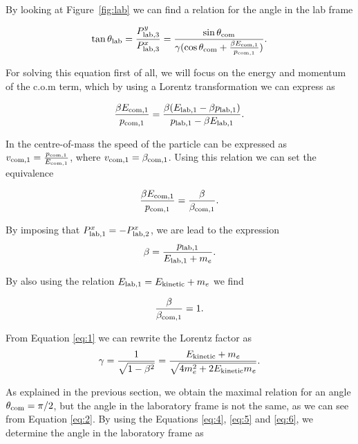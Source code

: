 \documentclass[10pt,swedish, openany]{book}
\begin{document}
By looking at Figure~\ref{fig:lab} we can find a relation for the angle in the lab frame

\begin{equation}\label{eq:2}
    \tan{\theta_{\rm lab}} = \frac{P^y_{\rm lab,3}}{P^x_{\rm lab,3}} = \frac{\sin{\theta_{\rm com}}}{\gamma(\cos{\theta_{\rm com}}+\frac{\beta E_{\rm com,1}}{p_{\rm com,1}})}.
\end{equation}

For solving this equation first of all, we will focus on the energy and momentum of the c.o.m term, which by using a Lorentz transformation we can express as

\begin{equation}\label{eq:3}
    \frac{\beta E_{\rm com,1}}{p_{\rm com,1}} = \frac{\beta (E_{\rm lab,1}-\beta p_{\rm lab,1})}{p_{\rm lab,1}-\beta E_{\rm lab,1}}.
\end{equation}

In the centre-of-mass the speed of the particle can be expressed as $v_{\rm com,1} = \frac{p_{\rm com,1}}{E_{\rm com,1}}$, where $v_{\rm com,1} = \beta_{\rm com,1}$. Using this relation we can set the equivalence

\begin{equation}\label{eq:4}
    \frac{\beta E_{\rm com,1}}{p_{\rm com,1}} = \frac{\beta}{\beta_{\rm com,1}}.
\end{equation}

By imposing that $P^x_{\rm lab,1}=-P^x_{\rm lab,2}$, we are lead to the expression
\begin{equation}\label{eq:1}
    \beta = \frac{p_{\rm lab,1}}{E_{\rm lab,1}+m_e}.
\end{equation}

By also using the relation $E_{\rm lab,1}=E_{\rm kinetic}+m_e$ we find 

\begin{equation}\label{eq:5}
    \frac{\beta}{\beta_{\rm com,1}} = 1.
\end{equation}

From Equation \ref{eq:1} we can rewrite the Lorentz factor as
\begin{equation}\label{eq:6}
    \gamma = \frac{1}{\sqrt{1-\beta^2}}= \frac{E_{\rm kinetic}+m_e}{\sqrt{4m_e^2 + 2 E_{\rm kinetic}m_e}}.
\end{equation}

As explained in the previous section, we obtain the maximal relation for an angle $\theta_{\rm com} = \pi/2$, but the angle in the laboratory frame is not the same, as we can see from Equation \ref{eq:2}. By using the Equations \ref{eq:4}, \ref{eq:5} and \ref{eq:6}, we determine the angle in the laboratory frame as
\end{document}
